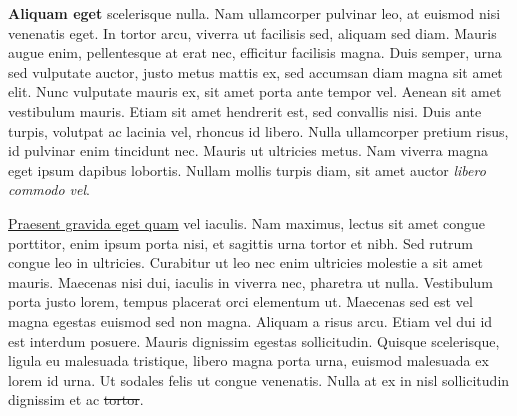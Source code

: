 \textbf{Aliquam eget } scelerisque nulla. Nam ullamcorper pulvinar leo, at euismod nisi venenatis eget. In tortor arcu, viverra ut facilisis sed, aliquam sed diam. Mauris augue enim, pellentesque at erat nec, efficitur facilisis magna. Duis semper, urna sed vulputate auctor, justo metus mattis ex, sed accumsan diam magna sit amet elit. Nunc vulputate mauris ex, sit amet porta ante tempor vel. Aenean sit amet vestibulum mauris. Etiam sit amet hendrerit est, sed convallis nisi. Duis ante turpis, volutpat ac lacinia vel, rhoncus id libero. Nulla ullamcorper pretium risus, id pulvinar enim tincidunt nec. Mauris ut ultricies metus. Nam viverra magna eget ipsum dapibus lobortis. Nullam mollis turpis diam, sit amet auctor \textit{libero commodo vel}.

\underline{Praesent gravida eget quam} vel iaculis. Nam maximus, lectus sit amet congue porttitor, enim ipsum porta nisi, et sagittis urna tortor et nibh. Sed rutrum congue leo in ultricies. Curabitur ut leo nec enim ultricies molestie a sit amet mauris. Maecenas nisi dui, iaculis in viverra nec, pharetra ut nulla. Vestibulum porta justo lorem, tempus placerat orci elementum ut. Maecenas sed est vel magna egestas euismod sed non magna. Aliquam a risus arcu. Etiam vel dui id est interdum posuere. Mauris dignissim egestas sollicitudin. Quisque scelerisque, ligula eu malesuada tristique, libero magna porta urna, euismod malesuada ex lorem id urna. Ut sodales felis ut congue venenatis. Nulla at ex in nisl sollicitudin dignissim et ac \sout{tortor}.
